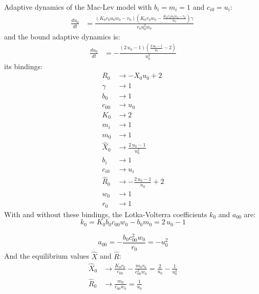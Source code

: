 \documentclass{article}
\begin{document}
Adaptive dynamics of the Mac-Lev model with $b_i=m_i=1$ and $c_{i0} = u_i$:
\[\begin{align*}
\frac{du_{0}}{dt} &= \frac{{\left(K_{0} r_{0} u_{0} w_{0} - r_{0}\right)} {\left(K_{0} r_{0} w_{0} - \frac{K_{0} r_{0} u_{0} w_{0} - r_{0}}{u_{0}}\right)} \gamma}{r_{0} u_{0}^{2} w_{0}}
\end{align*} \
\]
and the bound adaptive dynamics is:\begin{align*}
\frac{du_{0}}{dt} &= -\frac{{\left(2 \, u_{0} - 1\right)} {\left(\frac{2 \, u_{0} - 1}{u_{0}} - 2\right)}}{u_{0}^{2}}
\end{align*}its bindings:\begin{align*}
  R_{0} &\to -X_{0} u_{0} + 2 \\
  \gamma &\to 1 \\
  b_{0} &\to 1 \\
  c_{00} &\to u_{0} \\
  K_{0} &\to 2 \\
  m_{i} &\to 1 \\
  m_{0} &\to 1 \\
  \hat{X}_{0} &\to \frac{2 \, u_{0} - 1}{u_{0}^{2}} \\
  b_{i} &\to 1 \\
  c_{i0} &\to u_{i} \\
  \hat{R}_{0} &\to -\frac{2 \, u_{0} - 1}{u_{0}} + 2 \\
  w_{0} &\to 1 \\
  r_{0} &\to 1
\end{align*}With and without these bindings, the Lotka-Volterra coefficients $k_0$ and $a_{00}$ are:
\[
  k_{0} = K_{0} b_{0} c_{00} w_{0} - b_{0} m_{0} = 2 \, u_{0} - 1
\]

\[
  a_{00} = -\frac{b_{0} c_{00}^{2} w_{0}}{r_{0}} = -u_{0}^{2}
\]
And the equilibrium values $\hat X$ and $\hat R$:\begin{align*}
  \hat X_0 &\to \frac{K_{0} r_{0}}{c_{00}} - \frac{m_{0} r_{0}}{c_{00}^{2} w_{0}} = \frac{2}{u_{0}} - \frac{1}{u_{0}^{2}}\\
  \hat R_0 &\to \frac{m_{0}}{c_{00} w_{0}} = \frac{1}{u_{0}}
\end{align*}
\end{document}
